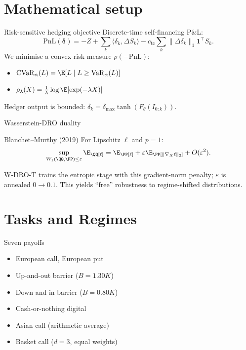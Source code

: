 \documentclass[aspectratio=169,10pt]{beamer}
\newcommand{\cvar}{\mathrm{CVaR}}
\begin{document}
\section{Mathematical setup}

\begin{frame}{Risk-sensitive hedging objective}
Discrete-time self-financing P\&L:
\[
\mathrm{PnL}(\boldsymbol\delta) = -Z + \sum_k \langle \delta_k, \Delta S_k\rangle
- c_{\mathrm{tc}}\sum_k \|\Delta\delta_k\|_1 \mathbf 1^\top S_k.
\]
We minimise a convex risk measure $\rho(-\mathrm{PnL})$:
\begin{itemize}
\item $\cvar_\alpha(L) = \E[L\mid L\ge\mathrm{VaR}_\alpha(L)]$
\item $\rho_\lambda(X) = \tfrac{1}{\lambda}\log\E[\exp(-\lambda X)]$
\end{itemize}
Hedger output is bounded: $\delta_k = \delta_{\max}\tanh(F_\theta(I_{0:k}))$.
\end{frame}

\begin{frame}{Wasserstein-DRO duality}
\begin{block}{Blanchet--Murthy (2019)}
For Lipschitz $\ell$ and $p=1$:
\[
\sup_{W_1(\QQ,\PP)\le\varepsilon}\E_\QQ[\ell] = \E_\PP[\ell] +
\varepsilon\E_\PP[\|\nabla_X\ell\|_2] + O(\varepsilon^2).
\]
\end{block}

W-DRO-T trains the entropic stage with this gradient-norm penalty;
$\varepsilon$ is annealed $0\to0.1$.  This yields ``free'' robustness to
regime-shifted distributions.
\end{frame}

\section{Tasks and Regimes}

\begin{frame}{Seven payoffs}
\begin{itemize}
\item European call, European put
\item Up-and-out barrier ($B=1.30K$)
\item Down-and-in barrier ($B=0.80K$)
\item Cash-or-nothing digital
\item Asian call (arithmetic average)
\item Basket call ($d=3$, equal weights)
\end{itemize}
\end{frame}
\end{document}
